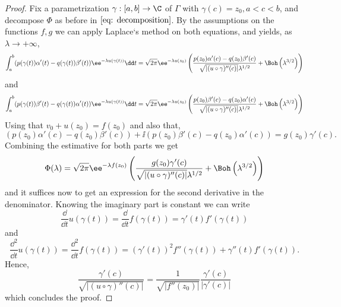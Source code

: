 \begin{proof}
	Fix a parametrization $\gamma : [a,b] \rightarrow \C$ of $\Gamma$ with $\gamma(c) = z_0, a < c < b$, and decompose $\Phi$ as before in $\ref{eq: decomposition}$. By the assumptions on the functions $f, g$ we can apply Laplace`s method on both equations, and yields, as $\lambda \rightarrow + \infty$,
	\begin{equation}
		\int_{a}^{b} (p(\gamma(t))\alpha'(t)-q(\gamma(t))\beta'(t)) \ee^{-\lambda u(\gamma(t))} \dd t = \sqrt{2\pi} \ee^{-\lambda u(z_0)} \left( \frac{p(z_0)\alpha'(c)-q(z_0)\beta'(c)}{\sqrt{|(u \circ \gamma)''(c)|} \lambda^{1/2}} + \Boh \left(\lambda^{3/2}\right) \right)
	\end{equation}
	and
	\begin{equation}
		\int_{a}^{b} (p(\gamma(t))\beta'(t)-q(\gamma(t))\alpha'(t)) \ee^{-\lambda u(\gamma(t))} \dd t = \sqrt{2\pi} \ee^{-\lambda u(z_0)} \left( \frac{p(z_0)\beta'(c)-q(z_0)\alpha'(c)}{\sqrt{|(u \circ \gamma)''(c)|} \lambda^{1/2}} + \Boh \left(\lambda^{3/2}\right) \right)
	\end{equation}
	Using that $v_0 + u(z_0) = f(z_0)$ and also that,
	\begin{equation}
		 (p(z_0)\alpha'(c)-q(z_0)\beta'(c)) + \ii (p(z_0)\beta'(c)-q(z_0)\alpha'(c)) = g(z_0)\gamma'(c).
	\end{equation}
	Combining the estimative for both parts we get
	\begin{equation}
		\Phi(\lambda) = \sqrt{2\pi} \ee^{-\lambda f(z_0)} \left( \frac{g(z_0)\gamma'(c)}{\sqrt{|(u \circ \gamma)''(c)|} \lambda^{1/2}} + \Boh \left(\lambda^{3/2}\right) \right)
	\end{equation} 
	and it suffices now to get an expression for the second derivative in the denominator. Knowing the imaginary part is constant we can write
	\begin{equation}
		\frac{\dd}{\dd t} u(\gamma(t)) = \frac{\dd}{\dd t} f(\gamma(t)) = \gamma'(t) f'(\gamma(t))
	\end{equation}
	and
	\begin{equation}
		\frac{\dd^2}{\dd t} u(\gamma(t)) = \frac{\dd^2}{\dd t} f(\gamma(t)) = (\gamma'(t))^2 f''(\gamma(t)) + \gamma''(t) f'(\gamma(t)).
	\end{equation}
	Hence,
	\begin{equation}
		\frac{\gamma'(c)}{\sqrt{|(u \circ \gamma)''(c)|}} = \frac{1}{\sqrt{|f''(z_0)|}} \frac{\gamma'(c)}{|\gamma'(c)|}
	\end{equation}
	which concludes the proof.
\end{proof}

